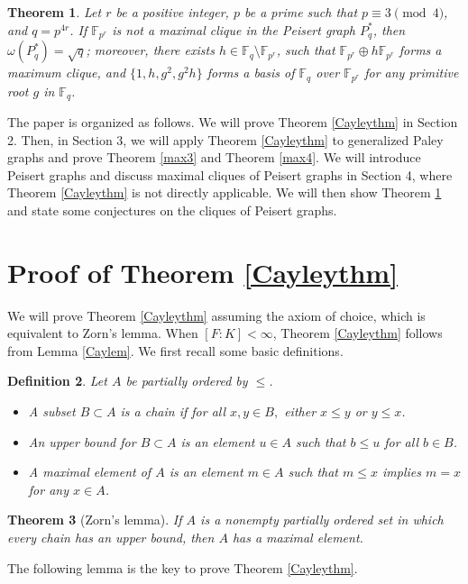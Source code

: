 \documentclass[12pt,oneside]{amsart}
\newtheorem{thm}{Theorem}[section]
\newtheorem{defn}[thm]{Definition}
\newcommand{\F}{\mathbb{F}}
\begin{document}
\begin{thm}\label{maxP*}
Let $r$ be a positive integer, $p$ be a prime such that $p \equiv 3 \pmod 4$, and  $q=p^{4r}$.  If $\F_{p^r}$ is not a maximal clique in the Peisert graph $P^*_q$, then $\omega(P^*_q)= \sqrt{q}$; moreover, there exists $h \in \F_q \setminus \F_{p^r}$, such that $\F_{p^r} \oplus h\F_{p^r}$ forms a maximum clique, and $\{1,h,g^2,g^2h\}$ forms a basis of $\F_q$ over $\F_{p^r}$ for any primitive root $g$ in $\F_q$.
\end{thm}


The paper is organized as follows. We will prove Theorem \ref{Cayleythm} in Section 2. Then, in Section 3, we will apply Theorem \ref{Cayleythm} to generalized Paley graphs and prove Theorem \ref{max3} and Theorem \ref{max4}. We will introduce Peisert graphs and discuss maximal cliques of Peisert graphs in Section 4, where Theorem \ref{Cayleythm} is not directly applicable. We will then show Theorem \ref{maxP*} and state some conjectures on the cliques of Peisert graphs.

\section{Proof of Theorem \ref{Cayleythm}}
We will prove Theorem \ref{Cayleythm} assuming the axiom of choice, which is equivalent to Zorn's lemma. When $[F:K]<\infty$, Theorem \ref{Cayleythm} follows from Lemma \ref{Caylem}. We first recall some basic definitions.

\begin{defn}
Let $A$ be partially ordered by $\leq$.
\begin{itemize}
    \item A subset $B \subset A$ is a chain if for all $x, y \in B,$ either $x \leq y$ or $y \leq x$.
    \item An upper bound for $B \subset A$ is an element $u \in A$ such that $b \leq u$ for all $b \in B$.
    \item  A maximal element of $A$ is an element $m \in A$ such that $m \leq x$ implies $m=x$ for any $x \in A$.
\end{itemize}
\end{defn}

\begin{thm} [Zorn's lemma] 
If $A$ is a nonempty partially ordered set in which every chain has an upper bound, then $A$ has a maximal element.
\end{thm}

The following lemma is the key to prove Theorem \ref{Cayleythm}.
\end{document}
